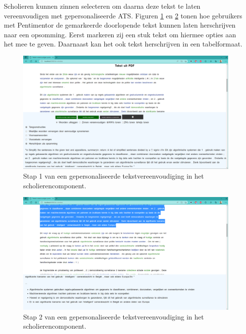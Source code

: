 Scholieren kunnen zinnen selecteren om daarna deze tekst te laten vereenvoudigen met gepersonaliseerde ATS. Figuren \ref{img:proto-scholieren-step-1} en \ref{img:proto-scholieren-step-3} tonen hoe gebruikers met Pentimentor de gemarkeerde doorlopende tekst kunnen laten herschrijven naar een opsomming. Eerst markeren zij een stuk tekst om hiermee opties aan het mee te geven. Daarnaast kan het ook tekst herschrijven in een tabelformaat.

\begin{center}
	\begin{figure}[H]
		\includegraphics[width=\linewidth]{img/proto-opsomming-1.png}
		\caption{Stap 1 van een gepersonaliseerde tekstvereenvoudiging in het scholierencomponent.}
		\label{img:proto-scholieren-step-1}
	\end{figure}
\end{center}

\begin{center}
	\begin{figure}[H]
		\includegraphics[width=\linewidth]{img/proto-opsomming-3.png}
		\caption{Stap 2 van een gepersonaliseerde tekstvereenvoudiging in het scholierencomponent.}
		\label{img:proto-scholieren-step-3}
	\end{figure}
\end{center}

